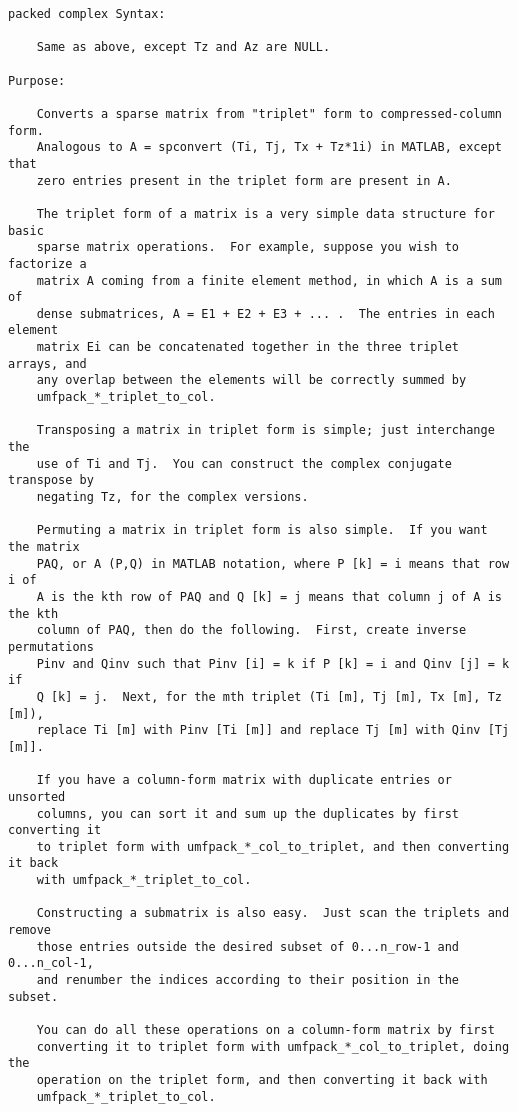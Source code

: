 \documentclass[11pt]{article}
\begin{document}
{\begin{verbatim}
packed complex Syntax:

    Same as above, except Tz and Az are NULL.

Purpose:

    Converts a sparse matrix from "triplet" form to compressed-column form.
    Analogous to A = spconvert (Ti, Tj, Tx + Tz*1i) in MATLAB, except that
    zero entries present in the triplet form are present in A.

    The triplet form of a matrix is a very simple data structure for basic
    sparse matrix operations.  For example, suppose you wish to factorize a
    matrix A coming from a finite element method, in which A is a sum of
    dense submatrices, A = E1 + E2 + E3 + ... .  The entries in each element
    matrix Ei can be concatenated together in the three triplet arrays, and
    any overlap between the elements will be correctly summed by
    umfpack_*_triplet_to_col.

    Transposing a matrix in triplet form is simple; just interchange the
    use of Ti and Tj.  You can construct the complex conjugate transpose by
    negating Tz, for the complex versions.

    Permuting a matrix in triplet form is also simple.  If you want the matrix
    PAQ, or A (P,Q) in MATLAB notation, where P [k] = i means that row i of
    A is the kth row of PAQ and Q [k] = j means that column j of A is the kth
    column of PAQ, then do the following.  First, create inverse permutations
    Pinv and Qinv such that Pinv [i] = k if P [k] = i and Qinv [j] = k if
    Q [k] = j.  Next, for the mth triplet (Ti [m], Tj [m], Tx [m], Tz [m]),
    replace Ti [m] with Pinv [Ti [m]] and replace Tj [m] with Qinv [Tj [m]].

    If you have a column-form matrix with duplicate entries or unsorted
    columns, you can sort it and sum up the duplicates by first converting it
    to triplet form with umfpack_*_col_to_triplet, and then converting it back
    with umfpack_*_triplet_to_col.

    Constructing a submatrix is also easy.  Just scan the triplets and remove
    those entries outside the desired subset of 0...n_row-1 and 0...n_col-1,
    and renumber the indices according to their position in the subset.

    You can do all these operations on a column-form matrix by first
    converting it to triplet form with umfpack_*_col_to_triplet, doing the
    operation on the triplet form, and then converting it back with
    umfpack_*_triplet_to_col.


\end{verbatim}}
\end{document}
